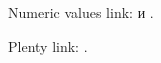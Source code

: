 \documentclass{article}
\begin{document}
Numeric values link: \cite{Graham1995} и \cite{Thomas2008}.

Plenty link: \cite{Graham1995,Thomas2008}.



\end{document}
